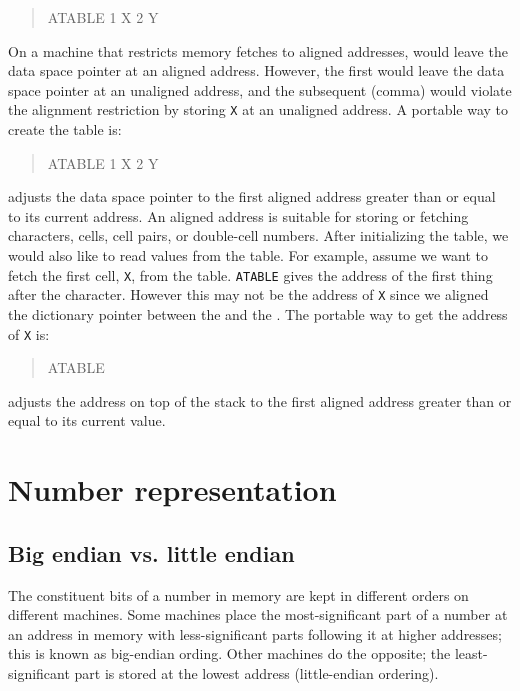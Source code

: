 \begin{quote}\ttfamily
	 ATABLE 1  X \word{,} 2  Y \word{,}
\end{quote}

On a machine that restricts memory fetches to aligned addresses,
 would leave the data space pointer at an aligned address.
However, the first  would leave the data space pointer at an
unaligned address,  and the subsequent \word{,} (comma) would violate
the alignment restriction by storing \texttt{X} at an unaligned address.
A portable way to create the table is:

\begin{quote}\ttfamily
	 ATABLE 1 
		 X \word{,} 2   Y \word{,}
\end{quote}

 adjusts the data space pointer to the first aligned
address greater than or equal to its current address. An aligned
address is suitable for storing or fetching characters, cells, cell
pairs, or double-cell numbers.
%
After initializing the table, we would also like to read values from
the table. For example, assume we want to fetch the first cell,
\texttt{X}, from the table. \texttt{ATABLE}  gives the
address of the first thing after the character. However this may not
be the address of \texttt{X} since we aligned the dictionary pointer
between the  and the \word{,}. The portable way to get the
address of \texttt{X} is:

\begin{quote}\ttfamily
	ATABLE  
\end{quote}

 adjusts the address on top of the stack to the first
aligned address greater than or equal to its current value.


\section{Number representation} %

\subsection{Big endian vs. little endian} %
\label{port:endian}

The constituent bits of a number in memory are kept in different
orders on different machines. Some machines place the most-significant
part of a number at an address in memory with less-significant parts
following it at higher addresses; this is known as big-endian
ording. Other machines do the opposite; the
least-significant part is stored at the lowest address (little-endian
ordering).

